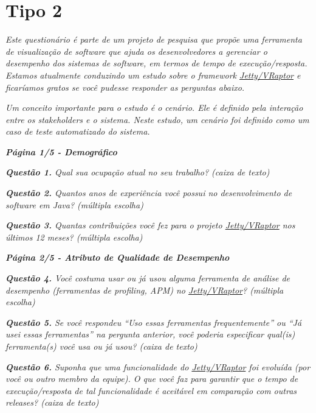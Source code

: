 \section{Tipo 2} \label{sec:apendice-a-tipo-2}

\begin{framed}
  \noindent \textit{\textbf{\toolName}}
  \par
  \par
  \noindent \textit{Este questionário é parte de um projeto de pesquisa que propõe uma ferramenta de visualização de software que ajuda os desenvolvedores a gerenciar o desempenho dos sistemas de software, em termos de tempo de execução/resposta. Estamos atualmente conduzindo um estudo sobre o framework \underline{Jetty/VRaptor} e ficaríamos gratos se você pudesse responder as perguntas abaixo.}
  \par
  \noindent \textit{Um conceito importante para o estudo é o cenário. Ele é definido pela interação entre os stakeholders e o sistema. Neste estudo, um cenário foi definido como um caso de teste automatizado do sistema.}
\end{framed}
	
\begin{framed}
	\noindent \textit{\textbf{Página 1/5 - Demográfico}}
	\par
	\noindent \textit{\textbf{Questão 1.} Qual sua ocupação atual no seu trabalho? (caixa de texto)}
	\par
	\noindent \textit{\textbf{Questão 2.} Quantos anos de experiência você possui no desenvolvimento de software em Java? (múltipla escolha)}
	\par
	\noindent \textit{\textbf{Questão 3.} Quantas contribuições você fez para o projeto \underline{Jetty/VRaptor} nos últimos 12 meses? (múltipla escolha)}
\end{framed}

\begin{framed}
	\noindent \textit{\textbf{Página 2/5 - Atributo de Qualidade de Desempenho}}
	\par
	\noindent \textit{\textbf{Questão 4.} Você costuma usar ou já usou alguma ferramenta de análise de desempenho (ferramentas de profiling, APM) no \underline{Jetty/VRaptor}? (múltipla escolha)}
	\par
	\noindent \textit{\textbf{Questão 5.} Se você respondeu ``Uso essas ferramentas frequentemente'' ou ``Já usei essas ferramentas'' na pergunta anterior, você poderia especificar qual(is) ferramenta(s) você usa ou já usou? (caixa de texto)}
	\par
	\noindent \textit{\textbf{Questão 6.} Suponha que uma funcionalidade do \underline{Jetty/VRaptor} foi evoluída (por você ou outro membro da equipe). O que você faz para garantir que o tempo de execução/resposta de tal funcionalidade é aceitável em comparação com outras releases? (caixa de texto)}
\end{framed}

